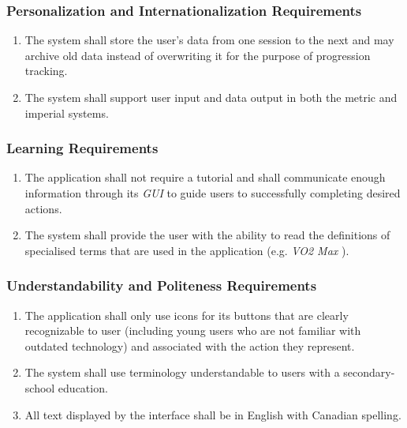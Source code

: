 \documentclass[12pt,letterpaper]{article}
\begin{document}
\subsubsection{Personalization and Internationalization Requirements}
\label{ssub:personalization_and_internationalization_requirements}
\begin{enumerate}[{UH-PI}1. ]
	\item The system shall store the user's data from one session to the next and may archive old data instead of overwriting it for the purpose of progression tracking.
	
	\item The system shall support user input and data output in both the metric and imperial systems.
\end{enumerate}

\subsubsection{Learning Requirements}
\label{ssub:learning_requirements}
\begin{enumerate}[{UH-L}1. ]
	\item The application shall not require a tutorial and shall communicate enough information through its \textit{GUI} to guide users to successfully completing desired actions.

	\item The system shall provide the user with the ability to read the definitions of specialised terms that are used in the application (e.g. \textit{VO2 Max} ). 
\end{enumerate}

\subsubsection{Understandability and Politeness Requirements}
\label{ssub:understandability_and_politeness_requirements}
\begin{enumerate}[{UH-UP}1. ]
	\item The application shall only use icons for its buttons that are clearly recognizable to user (including young users who are not familiar with outdated technology) and associated with the action they represent.
	
	\item The system shall use terminology understandable to users with a secondary-school education.
	
	\item All text displayed by the interface shall be in English with Canadian spelling.
	
\end{enumerate}
\end{document}
